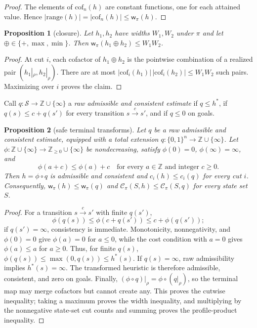 \documentclass[letterpaper]{article}
\newcommand{\states}{\ensuremath{\mathcal{S}}}
\newcommand{\hstar}{\ensuremath{h^{*}}}
\newcommand{\width}{\ensuremath{\mathsf{w}}}
\newcommand{\cutcount}[2]{\ensuremath{c_{#1}(#2)}}
\newcommand{\cutprod}[2]{\ensuremath{\mathcal{C}_{\pi}(#1,#2)}}
\newcommand{\sub}[2]{\ensuremath{\mathrm{cof}_{#1}(#2)}}
\newcommand{\hrange}{\ensuremath{\mathrm{range}}}
\theoremstyle{plain}
\newtheorem{proposition}{Proposition}
\theoremstyle{definition}
\theoremstyle{remark}
\begin{document}
\begin{proof}
The elements of $\sub{n}{h}$ are constant functions, one for each attained
value. Hence $|\hrange(h)|=|\sub{n}{h}|\leq\width_\pi(h)$.
\end{proof}

\begin{proposition}[closure]
\label{prop-closure}
Let $h_1,h_2$ have widths $W_1,W_2$ under $\pi$ and let
$\oplus\in\{+,\max,\min\}$. Then
$\width_\pi(h_1\oplus h_2)\leq W_1W_2$.
\end{proposition}

\begin{proof}
At cut $i$, each cofactor of $h_1\oplus h_2$ is the pointwise combination
of a realized pair $(h_1|_\rho,h_2|_\rho)$. There are at most
$|\sub{i}{h_1}|\,|\sub{i}{h_2}|\leq W_1W_2$ such pairs. Maximizing over
$i$ proves the claim.
\end{proof}

Call $q\colon\states\to\mathbb Z\cup\{\infty\}$ a \emph{raw admissible
and consistent estimate} if $q\leq\hstar$, if
$q(s)\leq c+q(s')$ for every transition $s\xrightarrow{c}s'$, and if
$q\leq0$ on goals.

\begin{proposition}[safe terminal transforms]
\label{prop-transform}
Let $q$ be a raw admissible and consistent estimate, equipped with a total
extension $q\colon\{0,1\}^n\to\mathbb Z\cup\{\infty\}$. Let
$\phi\colon\mathbb Z\cup\{\infty\}\to
\mathbb Z_{\geq0}\cup\{\infty\}$ be nondecreasing, satisfy
$\phi(0)=0$, $\phi(\infty)=\infty$, and
\[
  \phi(a+c)\leq\phi(a)+c
  \quad\text{for every $a\in\mathbb Z$ and integer $c\geq0$.}
\]
Then $h=\phi\circ q$ is admissible and consistent and
$\cutcount{i}{h}\leq\cutcount{i}{q}$ for every cut $i$. Consequently,
$\width_\pi(h)\leq\width_\pi(q)$ and
$\cutprod{S}{h}\leq\cutprod{S}{q}$ for every state set $S$.
\end{proposition}

\begin{proof}
For a transition $s\xrightarrow{c}s'$ with finite $q(s')$,
\[
  \phi(q(s))\leq\phi(c+q(s'))\leq c+\phi(q(s'));
\]
if $q(s')=\infty$, consistency is immediate. Monotonicity,
nonnegativity, and $\phi(0)=0$ give $\phi(a)=0$ for $a\leq0$, while the
cost condition with $a=0$ gives $\phi(a)\leq a$ for $a\geq0$. Thus, for
finite $q(s)$,
$\phi(q(s))\leq\max(0,q(s))\leq\hstar(s)$. If $q(s)=\infty$, raw
admissibility implies $\hstar(s)=\infty$. The transformed heuristic is
therefore admissible, consistent, and zero on goals. Finally,
$(\phi\circ q)|_\rho=\phi\circ(q|_\rho)$, so the terminal map may merge
cofactors but cannot create any. This proves the cutwise inequality; taking a
maximum proves the width inequality, and multiplying by the nonnegative
state-set cut counts and summing proves the profile-product inequality.
\end{proof}
\end{document}
